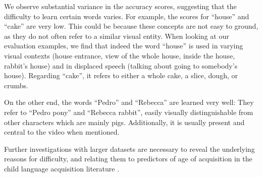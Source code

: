 We observe substantial variance in the accuracy scores, suggesting that the 
difficulty to learn certain words varies. For example, the 
scores for ``house'' and ``cake'' are very low. This could be because these 
concepts are not easy to ground, as they do not often refer to a similar visual 
entity. When looking at our evaluation examples, we find that indeed the word 
``house'' is used in varying visual contexts (house entrance, view of the whole 
house, inside the house, rabbit's house) and in displaced speech (talking about 
going to somebody's house). Regarding ``cake'', it refers to either a whole 
cake, a slice, dough, or crumbs.

On the other end, the words ``Pedro'' and ``Rebecca'' are learned very well: 
They refer to ``Pedro pony'' and ``Rebecca rabbit'', easily visually 
distinguishable from other characters which are mainly pigs. Additionally, it 
is usually present and central to the video when mentioned.

Further investigations with larger datasets are necessary to reveal the 
underlying reasons for difficulty, and relating them to predictors of age of 
acquisition in the child language acquisition literature 
\cite{roy2015predicting,frank2021variability}. 


